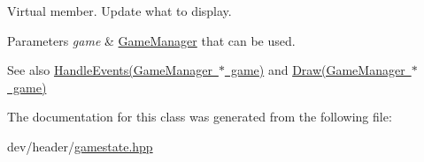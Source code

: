 Virtual member. Update what to display. 


\begin{DoxyParams}{Parameters}
{\em game} & \mbox{\hyperlink{classsfmlbe_1_1_game_manager}{Game\+Manager}} that can be used. \\
\hline
\end{DoxyParams}
\begin{DoxySeeAlso}{See also}
\mbox{\hyperlink{classsfmlbe_1_1_game_state_a44242b884396f04b6832436eb4325f05}{Handle\+Events(\+Game\+Manager $\ast$ game)}} and \mbox{\hyperlink{classsfmlbe_1_1_game_state_aa0b979c5694e117334eff4d3c1d25908}{Draw(\+Game\+Manager $\ast$ game)}} 
\end{DoxySeeAlso}


The documentation for this class was generated from the following file\+:\begin{DoxyCompactItemize}
\item 
dev/header/\mbox{\hyperlink{gamestate_8hpp}{gamestate.\+hpp}}\end{DoxyCompactItemize}
